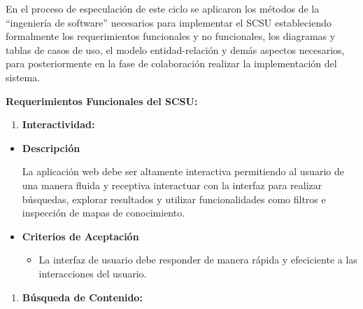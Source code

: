 \documentclass[
  12pt,
  openany]{book}
\providecommand{\tightlist}{%
  \setlength{\itemsep}{0pt}\setlength{\parskip}{0pt}}
\begin{document}
En el proceso de especulación de este ciclo se aplicaron los métodos de la ``ingeniería de software'' necesarios para implementar el SCSU estableciendo formalmente los requerimientos funcionales y no funcionales, los diagramas y tablas de casos de uso, el modelo entidad-relación y demás aspectos necesarios, para posteriormente en la fase de colaboración realizar la implementación del sistema.

\newpage

\textbf{Requerimientos Funcionales del SCSU:}

\begin{enumerate}
\def\labelenumi{\arabic{enumi}.}
\tightlist
\item
  \textbf{Interactividad:}
\end{enumerate}

\begin{itemize}
\item
  \textbf{Descripción}

  La aplicación web debe ser altamente interactiva permitiendo al usuario de una manera fluida y receptiva interactuar con la interfaz para realizar búsquedas, explorar resultados y utilizar funcionalidades como filtros e inspección de mapas de conocimiento.
\item
  \textbf{Criterios de Aceptación}

  \begin{itemize}
  \tightlist
  \item
    La interfaz de usuario debe responder de manera rápida y efeciciente a las interacciones del usuario.
  \end{itemize}
\end{itemize}

\begin{enumerate}
\def\labelenumi{\arabic{enumi}.}
\setcounter{enumi}{1}
\tightlist
\item
  \textbf{Búsqueda de Contenido:}
\end{enumerate}
\end{document}
